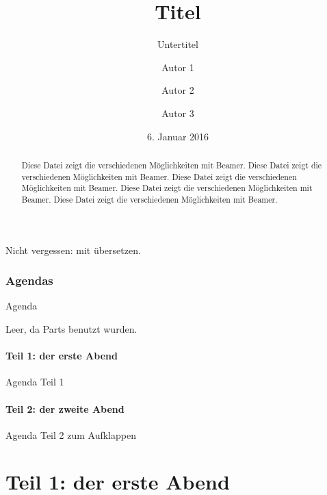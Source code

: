 \documentclass[t, aspectratio=169, handout, ngerman]{beamer}
\title{Titel}
\subtitle{Untertitel}
\author{Autor 1 \and Autor 2 \and Autor 3}
\date{6. Januar 2016}
\begin{document}




	\frame{\titlepage}

	\begin{frame}
		Nicht vergessen: mit  übersetzen.
	\end{frame}

	\begin{frame}
		\begin{abstract}
			Diese Datei zeigt die verschiedenen Möglichkeiten mit Beamer.
			Diese Datei zeigt die verschiedenen Möglichkeiten mit Beamer.
			Diese Datei zeigt die verschiedenen Möglichkeiten mit Beamer.
			Diese Datei zeigt die verschiedenen Möglichkeiten mit Beamer.
			Diese Datei zeigt die verschiedenen Möglichkeiten mit Beamer.
		\end{abstract}
	\end{frame}

	\section*{Agendas}

	\begin{frame}{Agenda}
		\tableofcontents

		Leer, da Parts benutzt wurden.
	\end{frame}

	\subsection*{Teil 1: der erste Abend}

	\begin{frame}{Agenda Teil 1}
		\tableofcontents[part=1, subsectionstyle=hide]
	\end{frame}

	\subsection*{Teil 2: der zweite Abend}

	\begin{frame}{Agenda Teil 2 zum Aufklappen}
		\tableofcontents[part=2, pausesections]
	\end{frame}





	\part{Teil 1: der erste Abend}
\end{document}
